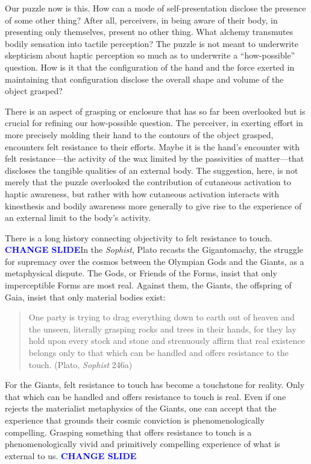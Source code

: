 \documentclass[12pt]{article}
\newcommand{\change}{\textcolor{blue}{\textbf{CHANGE SLIDE}}}
\begin{document}
Our puzzle now is this. How can a mode of self-presentation disclose the presence of some other thing? After all, perceivers, in being aware of their body, in presenting only themselves, present no other thing. What alchemy transmutes bodily sensation into tactile perception? The puzzle is not meant to underwrite skepticism about haptic perception so much as to underwrite a ``how-possible'' question. How is it that the configuration of the hand and the force exerted in maintaining that configuration disclose the overall shape and volume of the object grasped?

There is an aspect of grasping or enclosure that has so far been overlooked but is crucial for refining our how-possible question. The perceiver, in exerting effort in more precisely molding their hand to the contours of the object grasped, encounters felt resistance to their efforts. Maybe it is the hand's encounter with felt resistance---the activity of the wax limited by the passivities of matter---that discloses the tangible qualities of an external body. The suggestion, here, is not merely that the puzzle overlooked the contribution of cutaneous activation to haptic awareness, but rather with how cutaneous activation interacts with kinesthesis and bodily awareness more generally to give rise to the experience of an external limit to the body's activity.

There is a long history connecting objectivity to felt resistance to touch. \change In the \emph{Sophist}, Plato recasts the Gigantomachy, the struggle for supremacy over the cosmos between the Olympian Gods and the Giants, as a metaphysical dispute. The Gods, or Friends of the Forms, insist that only imperceptible Forms are most real. Against them, the Giants, the offspring of Gaia, insist that only material bodies exist:
\begin{quote}
	One party is trying to drag everything down to earth out of heaven and the unseen, literally grasping rocks and trees in their hands, for they lay hold upon every stock and stone and strenuously affirm that real existence belongs only to that which can be handled and offers resistance to the touch. (Plato, \emph{Sophist} 246a)
\end{quote}
For the Giants, felt resistance to touch has become a touchstone for reality. Only that which can be handled and offers resistance to touch is real. Even if one rejects the materialist metaphysics of the Giants, one can accept that the experience that grounds their cosmic conviction is phenomenologically compelling. Grasping something that offers resistance to touch is a phenomenologically vivid and primitively compelling experience of what is external to us. \change
\end{document}
